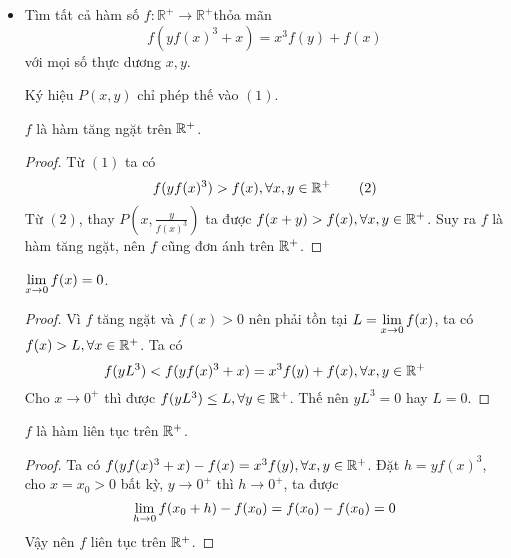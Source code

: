 \documentclass[11pt]{scrartcl}
\begin{document}
\begin{itemize}[label=, leftmargin=0em, itemsep=0.5em]
\begin{sol}
\begin{proof}
                Thay đổi vai trò $x, y$ trong đánh giá trên ta thu được $\frac{h(x)}{g(x)}=\frac{h(y)}{g(y)}=c \quad \forall x, y>0$.
        \end{proof}
        Trở lại bài toán. Giả sử tồn tại hàm số thỏa mãn.
        Áp dụng bổ đề trên ta suy ra tồn tại số thực dương $c$ sao cho
        $$
        \frac{f(x)}{x}=c \Longrightarrow f(x)=c x \quad \forall x>0
        $$
        Từ đây tìm được $c = 1$. Vậy hàm duy nhất thỏa mãn là $\boxed{f(x) = x, \xro}$.
    \end{sol}

    \item \begin{bt}
        Tìm tất cả hàm số $f: \mathbb{R}^{+} \rightarrow \mathbb{R}^{+}$thỏa mãn
        \[
        f\left(y f(x)^3+x\right)=x^3 f(y)+f(x)\tag{1}
        \]
        với mọi số thực dương $x, y$.
    \end{bt}
    \begin{sol}
        Ký hiệu $P(x,y)$ chỉ phép thế vào $(1)$.
        
         $f$ là hàm tăng ngặt trên $\mathbb{R^+}$. 
        \begin{proof}
            Từ $(1)$ ta có 
        \[
            f(yf(x)^3) > f(x), \forall x,y \in \mathbb{R^+} \tag{2}
        \]
        Từ $(2)$, thay $P\left(x,\frac{y}{f(x)^3}\right)$ ta được $f(x + y) > f(x), \forall x,y \in \mathbb{R^+}$. Suy ra $f$ là hàm tăng ngặt, nên $f$ cũng đơn ánh trên $\mathbb{R^+}$.
        \end{proof}

         $\displaystyle\lim_{x \to 0}f(x) = 0$. 
        \begin{proof}
            Vì $f$ tăng ngặt và $f(x) > 0$ nên phải tồn tại $L = \displaystyle\lim_{x \to 0}f(x)$, ta có $f(x) > L, \forall x\in \mathbb{R^+}$. Ta có 
            \[
            f(yL^3) < f(yf(x)^3 + x) = x^3f(y) + f(x), \forall x,y \in \mathbb{R^+}
            \]
            Cho $x \to 0^+$ thì được $f(yL^3) \leq L, \forall y\in \mathbb{R^+}$. Thế nên $yL^3 = 0$ hay $L = 0$.
            
        \end{proof}
         $f$ là hàm liên tục trên $\mathbb{R^+}$. 
        \begin{proof}
            Ta có $f(yf(x)^3 + x) - f(x) = x^3f(y), \forall x,y \in \mathbb{R^+}$. Đặt $h = yf(x)^3$, cho $x =x_0 > 0$ bất kỳ, $y \to 0^+$ thì $h \to 0^+$, ta được 
            \[
                \displaystyle\lim_{h \to 0} f(x_0 + h) - f(x_0) =  f(x_0) - f(x_0) = 0
            \]
            Vậy nên $f$ liên tục trên $\mathbb{R}^+$.
        \end{proof}
        

\end{sol}
\end{itemize}
\end{document}
